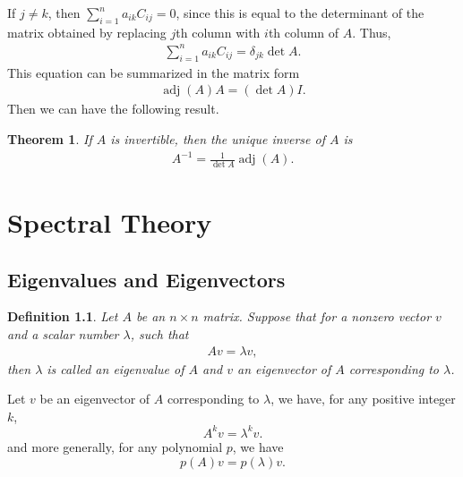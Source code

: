 \documentclass[11pt]{book}
\newtheorem{definition}{Definition}[chapter]
\newtheorem{theorem}{Theorem}[chapter]
\theoremstyle{definition}
\numberwithin{equation}{chapter}
\begin{document}
\medskip

If $j \neq k$, then $\sum^n_{i=1} a_{ik} C_{ij} = 0$, since this is equal to the determinant of the matrix obtained by replacing $j$th column with $i$th column of $A$. Thus,
\begin{align*}
    \sum^n_{i=1} a_{ik} C_{ij} = \delta_{jk} \det A.
\end{align*}
This equation can be summarized in the matrix form
\begin{align*}
    \operatorname{adj}(A) A = (\det A) I.
\end{align*}
Then we can have the following result.

\medskip

\begin{theorem}
If $A$ is invertible, then the unique inverse of $A$ is
\begin{align*}
    A^{-1} = \frac{1}{\det A} \operatorname{adj}(A).
\end{align*}
\end{theorem}













\medskip

\chapter{Spectral Theory}

\section{Eigenvalues and Eigenvectors}

\begin{definition}
Let $A$ be an $n\times n$ matrix. Suppose that for a nonzero vector $v$ and a scalar number $\lambda$, such that 
\begin{align*}
    Av = \lambda v,
\end{align*}
then $\lambda$ is called an eigenvalue of $A$ and $v$ an eigenvector of $A$ corresponding to $\lambda$.
\end{definition}

Let $v$ be an eigenvector of $A$ corresponding to $\lambda$, we have, for any positive integer $k$, 
$$A^k v = \lambda^k v.$$
and more generally, for any polynomial $p$, we have 
$$p(A)v = p(\lambda)v.$$
\end{document}
